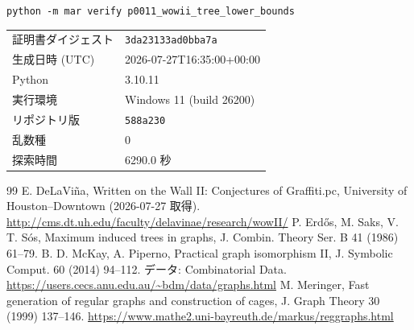 \documentclass[paper=a4,fontsize=10.5pt,jafontsize=10.5pt]{jlreq}
\theoremstyle{plain}
\theoremstyle{definition}
\begin{document}
\begin{center}\texttt{python -m mar verify p0011\_wowii\_tree\_lower\_bounds}\end{center}

\begin{center}\begin{tabular}{ll}\toprule
証明書ダイジェスト & \texttt{3da23133ad0bba7a} \\
生成日時 (UTC) & 2026-07-27T16:35:00+00:00 \\
Python & 3.10.11 \\
実行環境 & Windows 11 (build 26200) \\
リポジトリ版 & \texttt{588a230} \\
乱数種 & 0 \\
探索時間 & 6290.0 秒 \\
\bottomrule\end{tabular}\end{center}


\begin{thebibliography}{99}
 E. DeLaViña, Written on the Wall II: Conjectures of Graffiti.pc, University of Houston--Downtown (2026-07-27 取得). \url{http://cms.dt.uh.edu/faculty/delavinae/research/wowII/}
 P. Erdős, M. Saks, V. T. Sós, Maximum induced trees in graphs, J. Combin. Theory Ser. B 41 (1986) 61--79.
 B. D. McKay, A. Piperno, Practical graph isomorphism II, J. Symbolic Comput. 60 (2014) 94--112. データ: Combinatorial Data. \url{https://users.cecs.anu.edu.au/~bdm/data/graphs.html}
 M. Meringer, Fast generation of regular graphs and construction of cages, J. Graph Theory 30 (1999) 137--146. \url{https://www.mathe2.uni-bayreuth.de/markus/reggraphs.html}
\end{thebibliography}
\end{document}
